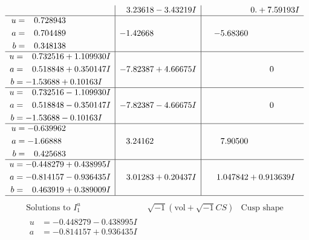 \documentclass[1p]{elsarticle_modified}
\theoremstyle{definition}
\newcommand{\I}{\sqrt{-1}}
\begin{document}
$$\begin{array}{c|c|c}
 & \phantom{-}3.23618 - 3.43219 I & \phantom{-0.000000 -}0. + 7.59193 I \\ \hline\begin{aligned}
u &= \phantom{-}0.728943\phantom{ +0.000000I} \\
a &= \phantom{-}0.704489\phantom{ +0.000000I} \\
b &= \phantom{-}0.348138\phantom{ +0.000000I}\end{aligned}
 & -1.42668\phantom{ +0.000000I} & -5.68360\phantom{ +0.000000I} \\ \hline\begin{aligned}
u &= \phantom{-}0.732516 + 1.109930 I \\
a &= \phantom{-}0.518848 + 0.350147 I \\
b &= -1.53688 + 0.10163 I\end{aligned}
 & -7.82387 + 4.66675 I & \phantom{-0.000000 } 0 \\ \hline\begin{aligned}
u &= \phantom{-}0.732516 - 1.109930 I \\
a &= \phantom{-}0.518848 - 0.350147 I \\
b &= -1.53688 - 0.10163 I\end{aligned}
 & -7.82387 - 4.66675 I & \phantom{-0.000000 } 0 \\ \hline\begin{aligned}
u &= -0.639962\phantom{ +0.000000I} \\
a &= -1.66888\phantom{ +0.000000I} \\
b &= \phantom{-}0.425683\phantom{ +0.000000I}\end{aligned}
 & \phantom{-}3.24162\phantom{ +0.000000I} & \phantom{-}7.90500\phantom{ +0.000000I} \\ \hline\begin{aligned}
u &= -0.448279 + 0.438995 I \\
a &= -0.814157 - 0.936435 I \\
b &= \phantom{-}0.463919 + 0.389009 I\end{aligned}
 & \phantom{-}3.01283 + 0.20437 I & \phantom{-}1.047842 + 0.913639 I\\
 \hline 
 \end{array}$$\newpage$$\begin{array}{c|c|c}  
\text{Solutions to }I^u_{1}& \I (\text{vol} + \sqrt{-1}CS) & \text{Cusp shape}\\
 \hline 
\begin{aligned}
u &= -0.448279 - 0.438995 I \\
a &= -0.814157 + 0.936435 I \\

\end{aligned}
\end{array}$$
\end{document}
